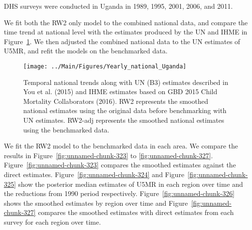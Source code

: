 \documentclass[12pt]{article}\usepackage[]{graphicx}\usepackage[]{color}
\newenvironment{knitrout}{}{} %
\begin{document}


DHS surveys were conducted in Uganda in 1989, 1995, 2001, 2006, and 2011.

We fit both the RW2 only model to the combined national data, and compare the time trend at national level with the estimates produced by the UN and IHME in Figure~\ref{fig:unnamed-chunk-322}. We then adjusted the combined national data to the UN estimates of U5MR, and refit the models on the benchmarked data. 

\begin{knitrout}
\color{fgcolor}\begin{figure}[bht]

{\centering \texttt{[image: ../Main/Figures/Yearly\_national\_Uganda]} 

}

\caption[Temporal national trends along with UN (B3) estimates described in You et al]{Temporal national trends along with UN (B3) estimates described in You et al. (2015) and IHME estimates based on GBD 2015 Child Mortality Collaborators (2016). RW2 represents the smoothed national estimates using the original data before benchmarking with UN estimates. RW2-adj represents the smoothed national estimates using the benchmarked data.}\label{fig:unnamed-chunk-322}
\end{figure}


\end{knitrout}
 

We fit the RW2 model to the benchmarked data in each area. 
We compare the results in Figure~\ref{fig:unnamed-chunk-323} to \ref{fig:unnamed-chunk-327}.
Figure~\ref{fig:unnamed-chunk-323} compares the smoothed estimates against the direct estimates. Figure~\ref{fig:unnamed-chunk-324} and Figure~\ref{fig:unnamed-chunk-325} show the posterior median estimates of U5MR in each region over time and the reductions from 1990 period respectively.
Figure~\ref{fig:unnamed-chunk-326} shows the smoothed estimates by region over time and Figure~\ref{fig:unnamed-chunk-327} compares the smoothed estimates with direct estimates from each survey for each region over time.


\end{document}

